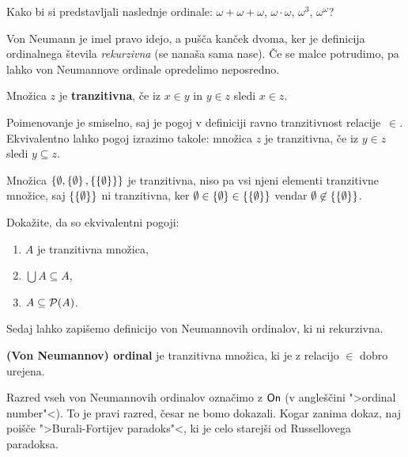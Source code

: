\begin{naloga}
  Kako bi si predstavljali naslednje ordinale: $\omega + \omega + \omega$, $\omega \cdot \omega$, $\omega^3$, $\omega^\omega$?
\end{naloga}

Von Neumann je imel pravo idejo, a pušča kanček dvoma, ker je definicija ordinalnega števila \emph{rekurzivna} (se nanaša sama nase). Če se malce potrudimo, pa lahko von Neumannove ordinale opredelimo neposredno.

\begin{definicija}
  Množica $z$ je \textbf{tranzitivna}, če iz $x \in y$ in $y \in z$ sledi $x \in z$.
\end{definicija}

\noindent
%
Poimenovanje je smiselno, saj je pogoj v definiciji ravno tranzitivnost relacije~$\in$.
Ekvivalentno lahko pogoj izrazimo takole: množica $z$ je tranzitivna, če iz $y \in z$ sledi $y \subseteq z$.

\begin{primer}
  Množica $\left\{\emptyset, \left\{\emptyset\right\}, \left\{\left\{\emptyset\right\}\right\}\right\}$ je tranzitivna, niso pa vsi njeni elementi tranzitivne množice, saj $\left\{\left\{\emptyset\right\}\right\}$ ni tranzitivna, ker $\emptyset \in \left\{\emptyset\right\} \in \left\{\left\{\emptyset\right\}\right\}$ vendar $\emptyset \not\in \left\{\left\{\emptyset\right\}\right\}$.
\end{primer}

\begin{naloga}
  Dokažite, da so ekvivalentni pogoji:
  \begin{enumerate}
  \item $A$ je tranzitivna množica,
  \item $\bigcup A \subseteq A$,
  \item $A \subseteq \mathcal{P}(A)$.
  \end{enumerate}
\end{naloga}

Sedaj lahko zapišemo definicijo von Neumannovih ordinalov, ki ni rekurzivna.

\begin{definicija}
  \label{def:von-neuman-ordinal}
  \textbf{(Von Neumannov) ordinal} je tranzitivna množica, ki je z relacijo $\in$ dobro urejena.
\end{definicija}

Razred vseh von Neumannovih ordinalov označimo z $\mathsf{On}$ (v angleščini ">ordinal number"<). To je pravi razred, česar ne bomo dokazali. Kogar zanima dokaz, naj poišče ">Burali-Fortijev paradoks"<, ki je celo starejši od Russellovega paradoksa.

